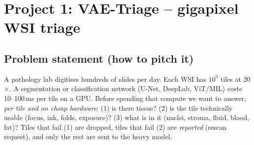 \chapter{Project 1: VAE-Triage -- gigapixel WSI triage}

\section{Problem statement (how to pitch it)}
A pathology lab digitises hundreds of slides per day. Each WSI has $10^5$ tiles at 20$\times$. A segmentation or
classification network (U-Net, DeepLab, ViT/MIL) costs 10--100\,ms per tile on a GPU. Before spending that compute
we want to answer, \emph{per tile and on cheap hardware}: (1) is there tissue? (2) is the tile technically usable
(focus, ink, folds, exposure)? (3) what is in it (nuclei, stroma, fluid, blood, fat)? Tiles that fail (1) are dropped,
tiles that fail (2) are \emph{reported} (rescan request), and only the rest are sent to the heavy model.


